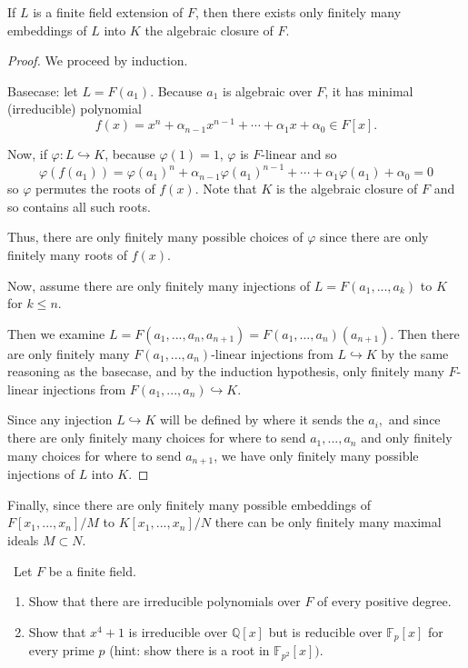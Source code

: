 \documentclass[12pt]{Qual}
\begin{document}
\begin{solution}
\begin{claim} If $L$ is a finite field extension of $F$, then there exists only finitely many embeddings of $L$ into $K$ the algebraic closure of $F.$
\begin{proof} We proceed by induction.

Basecase: let $L=F(a_1)$. Because $a_1$ is algebraic over $F$, it has minimal (irreducible) polynomial $$f(x)=x^n+\alpha_{n-1}x^{n-1}+\cdots+\alpha_1x+\alpha_0\in F[x].$$

Now, if $\varphi:L\hookrightarrow K$, because $\varphi(1)=1$, $\varphi$ is $F$-linear and so $$\varphi(f(a_1))=\varphi(a_1)^n+\alpha_{n-1}\varphi(a_1)^{n-1}+\cdots+\alpha_1\varphi(a_1)+\alpha_0=0$$ so $\varphi$ permutes the roots of $f(x).$ Note that $K$ is the algebraic closure of $F$ and so contains all such roots.

Thus, there are only finitely many possible choices of $\varphi$ since there are only finitely many roots of $f(x).$

Now, assume there are only finitely many injections of $L=F(a_1,...,a_k)$ to $K$ for $k\le n$.

Then we examine $L=F(a_1,...,a_n,a_{n+1})=F(a_1,...,a_n)(a_{n+1}).$ Then there are only finitely many $F(a_1,...,a_n)$-linear injections from $L\hookrightarrow K$ by the same reasoning as the basecase, and by the induction hypothesis, only finitely many $F$-linear injections from $F(a_1,...,a_n)\hookrightarrow K$.

Since any injection $L\hookrightarrow K$ will be defined by where it sends the $a_i,$ and since there are only finitely many choices for where to send $a_1,...,a_n$ and only finitely many choices for where to send $a_{n+1}$, we have only finitely many possible injections of $L$ into $K.$
\end{proof}
\end{claim}

Finally, since there are only finitely many possible embeddings of $F[x_1,...,x_n]/M$ to $K[x_1,...,x_n]/N$ there can be only finitely many maximal ideals $M\subset N$.
\end{solution}
\newpage


\begin{problem} $\,$
Let $F$ be a finite field.
\begin{enumerate}[label=(\alph*)]
    \item Show that there are irreducible polynomials over $F$ of every positive degree.
    \item Show that $x^4+1$ is irreducible over $\mathbb{Q}[x]$ but is reducible over $\mathbb{F}_p[x]$ for every prime $p$ (hint: show there is a root in $\mathbb{F}_{p^2}[x]).$
\end{enumerate}
\end{problem}
\end{document}
